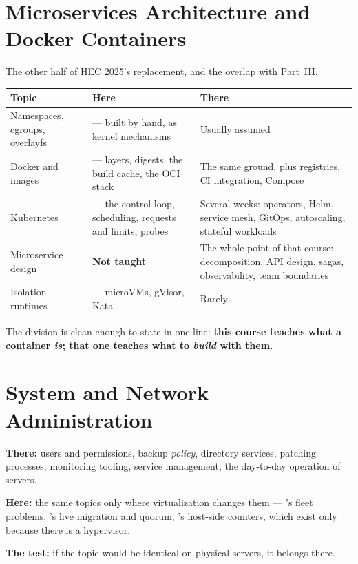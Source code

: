 \section{Microservices Architecture and Docker Containers}

The other half of HEC 2025's replacement, and the overlap with Part~III.

\begin{longtable}{@{}L{4.6cm}L{5.0cm}L{5.0cm}@{}}
\toprule
{}
\textbf{Topic} & \textbf{Here} & \textbf{There} \\
\midrule
\endhead
Namespaces, cgroups, overlayfs &  --- built by hand, as
kernel mechanisms & Usually assumed \\
Docker and images &  --- layers, digests, the build cache, the
OCI stack & The same ground, plus registries, CI integration, Compose \\
Kubernetes &  --- the control loop, scheduling, requests and
limits, probes & Several weeks: operators, Helm, service mesh, GitOps,
autoscaling, stateful workloads \\
Microservice design & \textbf{Not taught} & The whole point of that course:
decomposition, API design, sagas, observability, team boundaries \\
Isolation runtimes &  --- microVMs, gVisor, Kata & Rarely \\
\bottomrule
\end{longtable}

The division is clean enough to state in one line: \textbf{this course teaches
what a container \emph{is}; that one teaches what to \emph{build} with
them.}

\section{System and Network Administration}

\begin{tight}
  \item \textbf{There:} users and permissions, backup \emph{policy}, directory
        services, patching processes, monitoring tooling, service management,
        the day-to-day operation of servers.
  \item \textbf{Here:} the same topics only where virtualization changes them
        --- 's fleet problems, 's live
        migration and quorum, 's host-side counters, which
        exist only because there is a hypervisor.
  \item \textbf{The test:} if the topic would be identical on physical servers,
        it belongs there.
\end{tight}

